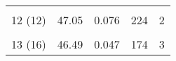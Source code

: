 \begin{table}[H]
{\begin{tabular}{|ccccc|}
\multicolumn{1}{|c|}{}                                                                                                                  & \multicolumn{1}{c|}{}                                                                                                                      & \multicolumn{1}{c|}{}                                                                                                                              & \multicolumn{1}{c|}{}                                                                                                                         &                                                      \\
\multicolumn{1}{|c|}{\multirow{-2}{*}{12 (12)}}                                                                                         & \multicolumn{1}{c|}{\multirow{-2}{*}{47.05}}                                                                                               & \multicolumn{1}{c|}{\multirow{-2}{*}{0.076}}                                                                                                       & \multicolumn{1}{c|}{\multirow{-2}{*}{224}}                                                                                                    & \multirow{-2}{*}{2}                                  \\ \hline
\multicolumn{1}{|c|}{}                                                                                                                  & \multicolumn{1}{c|}{}                                                                                                                      & \multicolumn{1}{c|}{}                                                                                                                              & \multicolumn{1}{c|}{}                                                                                                                         &                                                      \\
\multicolumn{1}{|c|}{\multirow{-2}{*}{13 (16)}}                                                                                         & \multicolumn{1}{c|}{\multirow{-2}{*}{46.49}}                                                                                               & \multicolumn{1}{c|}{\multirow{-2}{*}{0.047}}                                                                                                       & \multicolumn{1}{c|}{\multirow{-2}{*}{174}}                                                                                                    & \multirow{-2}{*}{3}                                  \\ \hline

\end{tabular}}
\end{table}
